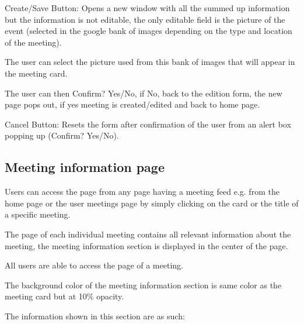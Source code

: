 \documentclass[conference]{IEEEtran}
\begin{document}
Create/Save Button: Opens a new window with all the summed up information but the information is not editable, the only editable field is the picture of the event (selected in the google bank of images depending on the type and location of the meeting). 

The user can select the picture used from this bank of images that will appear in the meeting card. 

The user can then Confirm? Yes/No, if No, back to the edition form, the new page pops out, if yes meeting is created/edited and back to home page.

Cancel Button: Resets the form after confirmation of the user from an alert box popping up (Confirm? Yes/No).

\subsection{Meeting information page}

Users can access the page from any page having a meeting feed e.g. from the home page or the user meetings page by simply clicking on the card or the title of a specific meeting. 

The page of each individual meeting contains all relevant information about the meeting, the meeting information section is displayed in the center of the page. 

All users are able to access the page of a meeting.

The background color of the meeting information section is same color as the meeting card but at 10\% opacity.

The information shown in this section are as such:
\end{document}

